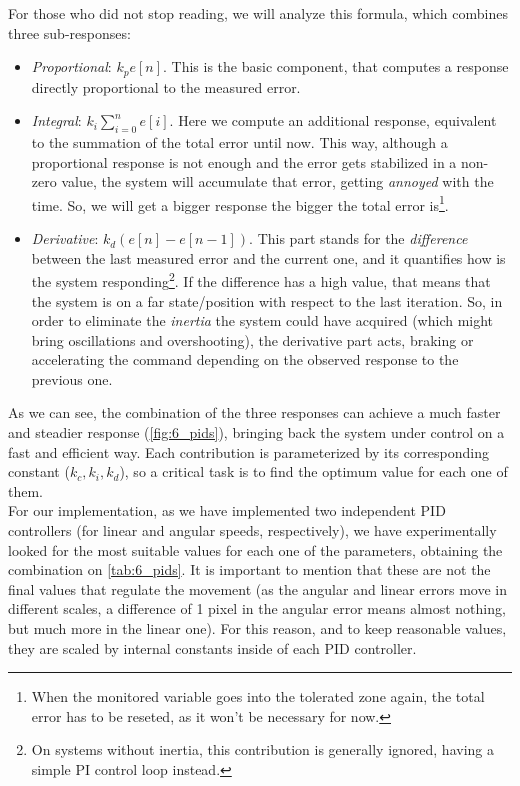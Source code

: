 			For those who did not stop reading, we will analyze this formula, which combines three sub-responses:
			
			\begin{itemize}
				\item \emph{Proportional}: $k_p e[n]$. This is the basic component, that computes a response directly proportional to the measured error.
				
				\item \emph{Integral}: $k_i \sum_{i=0}^{n}e[i]$. Here we compute an additional response, equivalent to the summation of the total error until now. This way, although a proportional response is not enough and the error gets stabilized in a non-zero value, the system will accumulate that error, getting \emph{annoyed} with the time. So, we will get a bigger response the bigger the total error is\footnote{When the monitored variable goes into the tolerated zone again, the total error has to be reseted, as it won't be necessary for now.}.
				
				\item \emph{Derivative}: $k_d (e[n] - e[n-1])$. This part stands for the \emph{difference} between the last measured error and the current one, and it quantifies how is the system responding\footnote{On systems without inertia, this contribution is generally ignored, having a simple PI control loop instead.}. If the difference has a high value, that means that the system is on a far state/position with respect to the last iteration. So, in order to eliminate the \emph{inertia} the system could have acquired (which might bring oscillations and overshooting), the derivative part acts, braking or accelerating the command depending on the observed response to the previous one.
			\end{itemize}
			
			As we can see, the combination of the three responses can achieve a much faster and steadier response (\autoref{fig:6_pids}), bringing back the system under control on a fast and efficient way. Each contribution is parameterized by its corresponding constant ($k_c, k_i, k_d$), so a critical task is to find the optimum value for each one of them.\\
			
			For our implementation, as we have implemented two independent PID controllers (for linear and angular speeds, respectively), we have experimentally looked for the most suitable values for each one of the parameters, obtaining the combination on \autoref{tab:6_pids}. It is important to mention that these are not the final values that regulate the movement (as the angular and linear errors move in different scales, a difference of 1 pixel in the angular error means almost nothing, but much more in the linear one). For this reason, and to keep reasonable values, they are scaled by internal constants inside of each PID controller.
			
